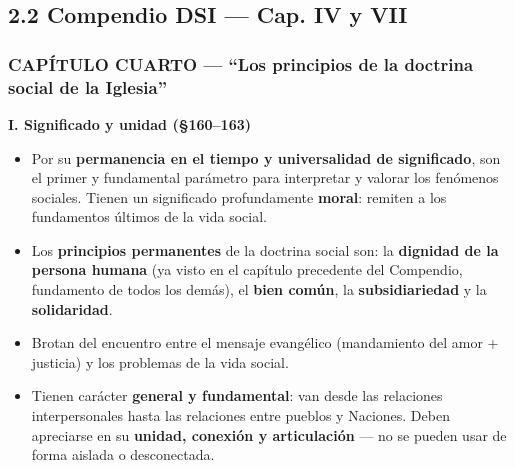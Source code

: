 \documentclass[10pt,a4paper]{article}
\begin{document}
\subsection{2.2 Compendio DSI --- Cap. IV y VII}

\subsubsection{CAPÍTULO CUARTO --- ``Los principios de la doctrina social de la Iglesia''}

\medskip\noindent \textbf{I. Significado y unidad (\S{}160--163)}\par\nopagebreak
\begin{itemize}
\item Por su \textbf{permanencia en el tiempo y universalidad de significado}, son el primer y fundamental parámetro para interpretar y valorar los fenómenos sociales. Tienen un significado profundamente \textbf{moral}: remiten a los fundamentos últimos de la vida social.
\item Los \textbf{principios permanentes} de la doctrina social son: la \textbf{dignidad de la persona humana} (ya visto en el capítulo precedente del Compendio, fundamento de todos los demás), el \textbf{bien común}, la \textbf{subsidiariedad} y la \textbf{solidaridad}.
\item Brotan del encuentro entre el mensaje evangélico (mandamiento del amor + justicia) y los problemas de la vida social.
\item Tienen carácter \textbf{general y fundamental}: van desde las relaciones interpersonales hasta las relaciones entre pueblos y Naciones. Deben apreciarse en su \textbf{unidad, conexión y articulación} --- no se pueden usar de forma aislada o desconectada.
\end{itemize}
\end{document}

